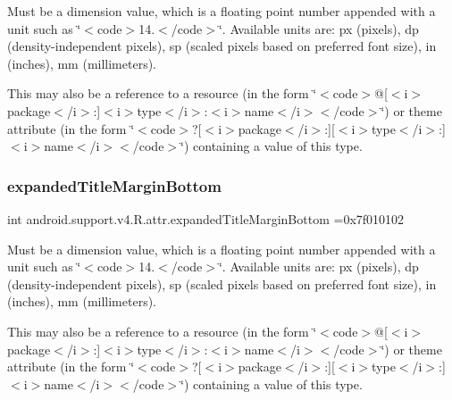 Must be a dimension value, which is a floating point number appended with a unit such as \char`\"{}$<$code$>$14.\+5sp$<$/code$>$\char`\"{}. Available units are\+: px (pixels), dp (density-\/independent pixels), sp (scaled pixels based on preferred font size), in (inches), mm (millimeters). 

This may also be a reference to a resource (in the form \char`\"{}$<$code$>$@\mbox{[}$<$i$>$package$<$/i$>$\+:\mbox{]}$<$i$>$type$<$/i$>$\+:$<$i$>$name$<$/i$>$$<$/code$>$\char`\"{}) or theme attribute (in the form \char`\"{}$<$code$>$?\mbox{[}$<$i$>$package$<$/i$>$\+:\mbox{]}\mbox{[}$<$i$>$type$<$/i$>$\+:\mbox{]}$<$i$>$name$<$/i$>$$<$/code$>$\char`\"{}) containing a value of this type. \mbox{\label{classandroid_1_1support_1_1v4_1_1R_1_1attr_a605a1cf1c2977b6aefafeafd2cb9c602}} 
\subsubsection{\texorpdfstring{expanded\+Title\+Margin\+Bottom}{expandedTitleMarginBottom}}
{\footnotesize\ttfamily int android.\+support.\+v4.\+R.\+attr.\+expanded\+Title\+Margin\+Bottom =0x7f010102\hspace{0.3cm}{\ttfamily [static]}}

Must be a dimension value, which is a floating point number appended with a unit such as \char`\"{}$<$code$>$14.\+5sp$<$/code$>$\char`\"{}. Available units are\+: px (pixels), dp (density-\/independent pixels), sp (scaled pixels based on preferred font size), in (inches), mm (millimeters). 

This may also be a reference to a resource (in the form \char`\"{}$<$code$>$@\mbox{[}$<$i$>$package$<$/i$>$\+:\mbox{]}$<$i$>$type$<$/i$>$\+:$<$i$>$name$<$/i$>$$<$/code$>$\char`\"{}) or theme attribute (in the form \char`\"{}$<$code$>$?\mbox{[}$<$i$>$package$<$/i$>$\+:\mbox{]}\mbox{[}$<$i$>$type$<$/i$>$\+:\mbox{]}$<$i$>$name$<$/i$>$$<$/code$>$\char`\"{}) containing a value of this type. \mbox{\label{classandroid_1_1support_1_1v4_1_1R_1_1attr_a3e17776e2fac31da200756b8bba4c1b6}} 
